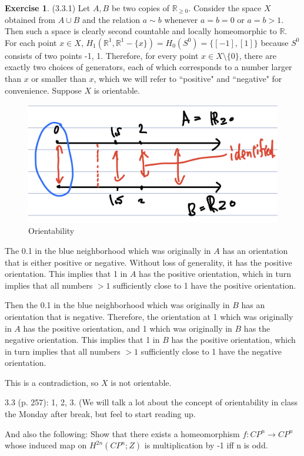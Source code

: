 \documentclass[12pt, psamsfonts]{amsart}
\theoremstyle{definition}
\newtheorem*{exer}{Exercise}
\theoremstyle{remark}
\numberwithin{equation}{section}
\begin{document}
\begin{exer}{(3.3.1)}
  Let $A, B$ be two copies of $\mathbb{R}_{\geq 0}$.
  Consider the space $X$ obtained from $A \cup B$ and the relation $a \sim b$ whenever $a = b = 0$ or $a = b > 1$.
  Then such a space is clearly second countable and locally homeomorphic to $\mathbb{R}$.
  For each point $x \in X$, $H_1(\mathbb{R}^1, \mathbb{R}^1 - \{ x \}) = H_0(S^0) = \{ [-1], [1] \}$ because $S^0$ consists of two points -1, 1.
  Therefore, for every point $x \in X \setminus \{ 0 \}$, there are exactly two choices of generators, each of which corresponds to a number larger than $x$ or smaller than $x$, which we will refer to ``positive" and ``negative" for convenience.
  Suppose $X$ is orientable.
  \begin{figure}[!htb]
  \includegraphics[width=.5\linewidth]{orientability.jpeg}
  \caption{Orientability}
  \label{fig:orientability}
  \end{figure}
  The 0.1 in the blue neighborhood which was originally in $A$ has an orientation that is either positive or negative.
  Without loss of generality, it has the positive orientation.
  This implies that 1 in $A$ has the positive orientation, which in turn implies that all numbers $> 1$ sufficiently close to 1 have the positive orientation.

  Then the 0.1 in the blue neighborhood which was originally in $B$ has an orientation that is negative.
  Therefore, the orientation at 1 which was originally in $A$ has the positive orientation, and 1 which was originally in $B$ has the negative orientation.
  This implies that 1 in $B$ has the positive orientation, which in turn implies that all numbers $> 1$ sufficiently close to 1 have the negative orientation.

  This is a contradiction, so $X$ is not orientable.
\end{exer}


3.3 (p. 257): 1, 2, 3. (We will talk a lot about the concept of orientability in class the Monday after break, but feel to start reading up.

And also the following: Show that there exists a homeomorphism $f: CP^n \to CP^n$ whose induced map on $H^{2n}(CP^n;Z)$ is multiplication by -1 iff n is odd.
\end{document}
